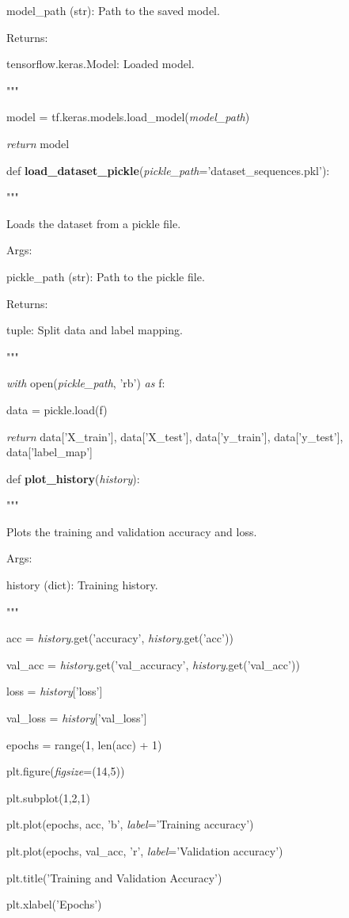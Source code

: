 \documentclass[
]{article}
\begin{document}
model\_path (str): Path to the saved model.

Returns:

tensorflow.keras.Model: Loaded model.

"""

model = tf.keras.models.load\_model(\emph{model\_path})

\emph{return} model

def \textbf{load\_dataset\_pickle}(\emph{pickle\_path}='dataset\_sequences.pkl'):

"""

Loads the dataset from a pickle file.

Args:

pickle\_path (str): Path to the pickle file.

Returns:

tuple: Split data and label mapping.

"""

\emph{with} open(\emph{pickle\_path}, 'rb') \emph{as} f:

data = pickle.load(f)

\emph{return} data{[}'X\_train'{]}, data{[}'X\_test'{]}, data{[}'y\_train'{]}, data{[}'y\_test'{]}, data{[}'label\_map'{]}

def \textbf{plot\_history}(\emph{history}):

"""

Plots the training and validation accuracy and loss.

Args:

history (dict): Training history.

"""

acc = \emph{history}.get('accuracy', \emph{history}.get('acc'))

val\_acc = \emph{history}.get('val\_accuracy', \emph{history}.get('val\_acc'))

loss = \emph{history}{[}'loss'{]}

val\_loss = \emph{history}{[}'val\_loss'{]}

epochs = range(1, len(acc) + 1)

plt.figure(\emph{figsize}=(14,5))

plt.subplot(1,2,1)

plt.plot(epochs, acc, 'b', \emph{label}='Training accuracy')

plt.plot(epochs, val\_acc, 'r', \emph{label}='Validation accuracy')

plt.title('Training and Validation Accuracy')

plt.xlabel('Epochs')
\end{document}
